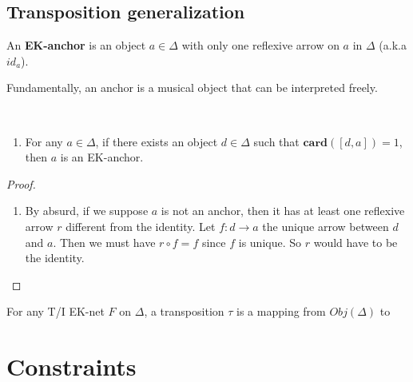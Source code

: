 \subsection{Transposition generalization}

\begin{defn}

\end{defn}

\begin{defn}[EK-anchor]
    An \textbf{EK-anchor} is an object $a\in\Delta$  with only one reflexive arrow on $a$ in $\Delta$ (a.k.a $id_a$).
\end{defn}

Fundamentally, an anchor is a musical object that can be interpreted freely.

\begin{prop}~
    \begin{enumerate}
        \item For any $a\in \Delta$, if there exists an object $d\in \Delta$ such that $\textbf{card}([d,a]) = 1$, then $a$ is an EK-anchor.
    \end{enumerate}
    \label{anchorProp}
\end{prop}

\begin{proof}
    \begin{enumerate}
        \item By absurd, if we suppose $a$ is not an anchor, then it has at least one reflexive arrow $r$ different from the identity. Let $f : d\rightarrow a$ the unique arrow between $d$ and $a$. Then we must have $r \circ f = f$ since $f$ is unique. So $r$ would have to be the identity.
    \end{enumerate}
\end{proof}

\begin{defn}
    For any T/I EK-net $F$ on $\Delta$, a transposition $\tau$ is a mapping from $Obj(\Delta)$ to $ $
\end{defn}


\section{Constraints}

